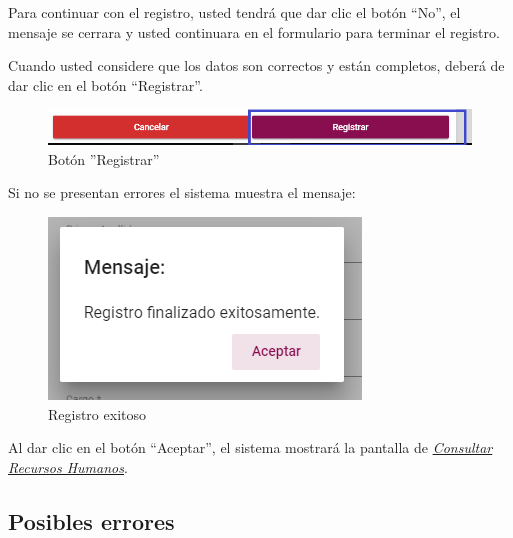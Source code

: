             Para continuar con el registro, usted tendrá que  dar clic el botón “No”, el mensaje se cerrara y usted continuara en el formulario para terminar el registro.

            Cuando usted considere que los datos son correctos y están completos, deberá de dar clic en el botón “Registrar”.

            \begin{figure}[H]
                \centering
                \hypertarget{btnreg}{\includegraphics[width=0.7\linewidth]{images/SP1/BtnRegistrar}}
                \caption{Botón ''Registrar''}
                \label{btnreg}
            \end{figure}

            Si no se presentan errores el sistema muestra el mensaje:


             \begin{figure}[H]
                \centering
            \includegraphics[width=0.4\linewidth]{images/SP1/MSG5}
                \caption{Registro exitoso}
                \label{mensaje5}

            \end{figure}

            Al dar clic en el botón “Aceptar”, el sistema mostrará la pantalla de  \hyperlink{consultarRH}{\textit{Consultar Recursos Humanos}}.

            \subsection{Posibles errores}

